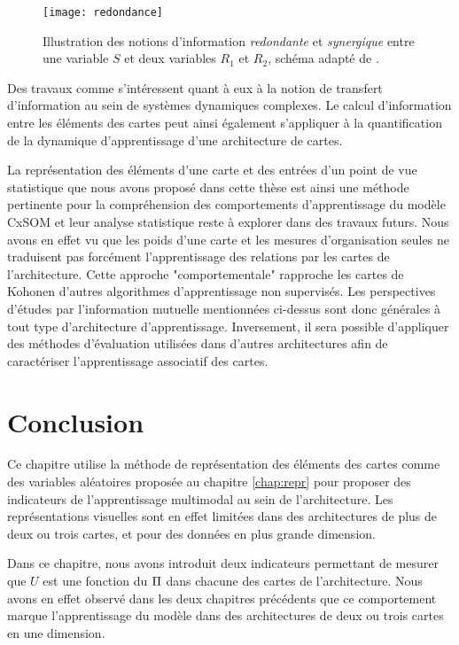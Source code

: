 \documentclass[../main]{subfiles}
\begin{document}
\begin{figure}
    \centering\texttt{[image: redondance]}
    \caption{Illustration des notions d'information \emph{redondante} et \emph{synergique} entre une variable $S$ et deux variables $R_1$ et $R_2$, schéma adapté de \cite{williams_nonnegative_2010}. \label{fig:redondance}
    }
\end{figure}
    

Des travaux comme \cite{lizier_detecting_2007,ceguerra_information_2011} s'intéressent quant à eux à la notion de transfert d'information au sein de systèmes dynamiques complexes. Le calcul d'information entre les éléments des cartes peut ainsi également s'appliquer à la quantification de la dynamique d'apprentissage d'une architecture de cartes.

La représentation des éléments d'une carte et des entrées d'un point de vue statistique que nous avons proposé dans cette thèse est ainsi une méthode pertinente pour la compréhension des comportements d'apprentissage du modèle CxSOM et leur analyse statistique reste à explorer dans des travaux futurs.
Nous avons en effet vu que les poids d'une carte et les mesures d'organisation seules ne traduisent pas forcément l'apprentissage des relations par les cartes de l'architecture. 
Cette approche "comportementale" rapproche les cartes de Kohonen d'autres algorithmes d'apprentissage non supervisés. Les perspectives d'études par l'information mutuelle mentionnées ci-dessus sont donc générales à tout type d'architecture d'apprentissage. Inversement, il sera possible d'appliquer des méthodes d'évaluation utilisées dans d'autres architectures afin de caractériser l'apprentissage associatif des cartes.


\section{Conclusion}

Ce chapitre utilise la méthode de représentation des éléments des cartes comme des variables aléatoires proposée au chapitre \ref{chap:repr} pour proposer des indicateurs de l'apprentissage multimodal au sein de l'architecture.
Les représentations visuelles sont en effet limitées dans des architectures de plus de deux ou trois cartes, et pour des données en plus grande dimension.

Dans ce chapitre, nous avons introduit deux indicateurs permettant de mesurer que $U$ est une fonction du $\Pi$ dans chacune des cartes de l'architecture. 
Nous avons en effet observé dans les deux chapitres précédents que ce comportement marque l'apprentissage du modèle dans des architectures de deux ou trois cartes en une dimension.
\end{document}
